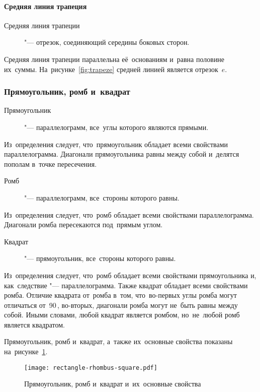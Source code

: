 \documentclass[]{scrartcl}
\begin{document}
\paragraph{Средняя линия трапеция}
\begin{description}
	\item[Средняя линия трапеции] "--- отрезок, соединяющий середины боковых сторон.
\end{description}
Средняя линия трапеции параллельна её~основаниям и~равна половине их~суммы. На~рисунке~\ref{fig:trapeze} средней линией является отрезок~${\textstyle e}$. 

\subsubsection{Прямоугольник, ромб и~квадрат}
\begin{description}
	\item[Прямоугольник] "--- параллелограмм, все~углы которого являются прямыми.
\end{description}
Из~определения следует, что~прямоугольник обладает всеми свойствами параллелограмма. Диагонали прямоугольника равны между собой и~делятся пополам в~точке пересечения.

\begin{description}
	\item[Ромб] "--- параллелограмм, все~стороны которого равны.
\end{description}
Из~определения следует, что~ромб обладает всеми свойствами параллелограмма. Диагонали ромба пересекаются под~прямым углом.

\begin{description}
	\item[Квадрат] "--- прямоугольник, все~стороны которого равны.
\end{description}
Из~определения следует, что~ромб обладает всеми свойствами прямоугольника и, как~следствие "--- параллелограмма. Также квадрат обладает всеми свойствами ромба. Отличие квадрата от~ромба в~том, что~во-первых углы ромба могут отличаться от~90\,\textdegree, во-вторых, диагонали ромба могут не~быть равны между собой. Иными словами, любой квадрат является ромбом, но~не~любой ромб является квадратом.

Прямоугольник, ромб и~квадрат, а~также их~основные свойства показаны на~рисунке~\ref{fig:rectangle-rhombus-square}.

\begin{figure}[ht]
	\centering %
	\texttt{[image: rectangle-rhombus-square.pdf]}
	\caption{Прямоугольник, ромб и~квадрат и~их~основные свойства}\label{fig:rectangle-rhombus-square}
\end{figure}
\end{document}
